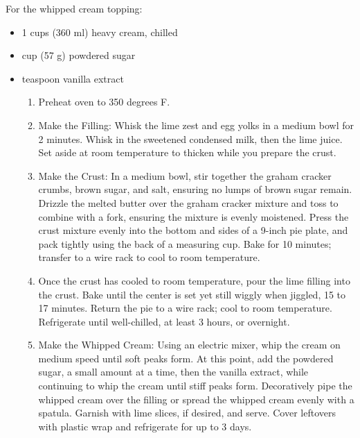 For the whipped cream topping:
\begin{itemize}
    \item 1  cups (360 ml) heavy cream, chilled
    \item {} cup (57 g) powdered sugar
    \item {} teaspoon vanilla extract
\begin{itemize}

\instructions
\begin{enumerate}
    \item Preheat oven to 350 degrees F.
    \item Make the Filling: Whisk the lime zest and egg yolks in a medium bowl
    for 2 minutes. Whisk in the sweetened condensed milk, then the lime juice.
    Set aside at room temperature to thicken while you prepare the crust.
    \item Make the Crust: In a medium bowl, stir together the graham cracker
    crumbs, brown sugar, and salt, ensuring no lumps of brown sugar remain.
    Drizzle the melted butter over the graham cracker mixture and toss to
    combine with a fork, ensuring the mixture is evenly moistened. Press the
    crust mixture evenly into the bottom and sides of a 9-inch pie plate, and
    pack tightly using the back of a measuring cup. Bake for 10 minutes;
    transfer to a wire rack to cool to room temperature.
    \item Once the crust has cooled to room temperature, pour the lime filling
    into the crust. Bake until the center is set yet still wiggly when jiggled,
    15 to 17 minutes. Return the pie to a wire rack; cool to room temperature.
    Refrigerate until well-chilled, at least 3 hours, or overnight.
    \item Make the Whipped Cream: Using an electric mixer, whip the cream on
    medium speed until soft peaks form. At this point, add the powdered sugar, a
    small amount at a time, then the vanilla extract, while continuing to whip
    the cream until stiff peaks form. Decoratively pipe the whipped cream over
    the filling or spread the whipped cream evenly with a spatula. Garnish with
    lime slices, if desired, and serve. Cover leftovers with plastic wrap and
    refrigerate for up to 3 days.
\end{enumerate}


\end{itemize}
\end{itemize}
